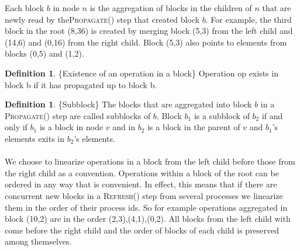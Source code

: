 \documentclass[10pt]{article}
\newtheorem{lemma}[theorem]{Lemma}
\theoremstyle{definition}
\newtheorem{definition}[theorem]{Definition}
\begin{document}
Each block $b$ in node $n$ is the aggregation of blocks in the  children of $n$ that are newly read by the\textsc{Propagate}() step that created block $b$. For example, the third block in the root (8,36) is created by merging block (5,3) from the left child and (14,6) and (0,16) from the right child. Block (5,3) also points to elements from blocks (0,5) and (1,2). 

\begin{definition}\{Existence of an operation in a block\}  Operation op exists in block b if it has propagated up to block b.
\end{definition}


\begin{definition}\{Subblock\}
  The blocks that are aggregated into block $b$ in a \textsc{Propagate}() step are called subblocks of $b$. Block $b_1$ is a subblock of $b_2$ if and only if $b_1$ is a block in node $v$ and in $b_2$ is a block in the parent of $v$ and $b_1$'s elements exits in $b_2$'s elements.
\end{definition}

\paragraph{}
We choose to linearize operations in a block from the left child before those from the right child as a convention. Operations within a block of the root can be ordered in any way that is convenient. In effect, this means that if there are concurrent new blocks in a \textsc{Refresh}() step from several processes we linearize them in the order of their process ids. So for example  operations aggregated in block (10,2) are in the order (2,3),(4,1),(0,2). All blocks from the left child with come before the right child and the order of blocks of each child is preserved among themselves.
\end{document}
